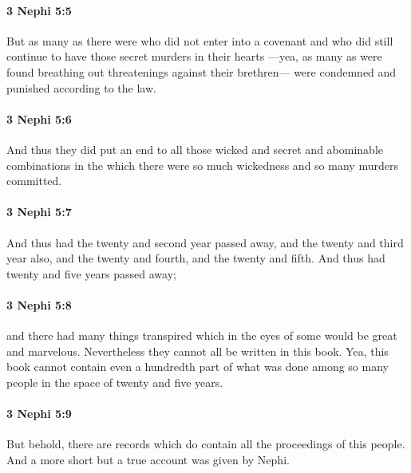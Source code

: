 		\paragraph{3 Nephi 5:5} %
			\label{3NEPHI-5-5}

			But as many as there were who did not enter into a covenant
			and who did still continue to have those secret murders in their hearts
			---yea, as many as were found breathing out threatenings against their brethren---
			were condemned and punished according to the law.

		\paragraph{3 Nephi 5:6} %
			\label{3NEPHI-5-6}

			And thus they did put an end
			to all those wicked and secret and abominable combinations
			in the which there were so much wickedness and so many murders committed.

		\paragraph{3 Nephi 5:7} %
			\label{3NEPHI-5-7}

			And thus had the twenty and second year passed away,
			and the twenty and third year also,
			and the twenty and fourth, and the twenty and fifth.
			And thus had twenty and five years passed away;

		\paragraph{3 Nephi 5:8} %
			\label{3NEPHI-5-8}

			and there had many things transpired
			which in the eyes of some would be great and marvelous.
			Nevertheless they cannot all be written in this book.
			Yea, this book cannot contain even a hundredth part of what was done
			among so many people in the space of twenty and five years.

		\paragraph{3 Nephi 5:9} %
			\label{3NEPHI-5-9}

			But behold, there are records which do contain all the proceedings of this people.
			And a more short but a true account was given by Nephi.

